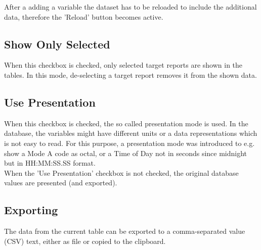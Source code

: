 After a adding a variable the dataset has to be reloaded to include the additional data, therefore the 'Reload' button becomes active.

\subsection{Show Only Selected}

When this checkbox is checked, only selected target reports are shown in the tables. In this mode, de-selecting a target report removes it from the shown data.

\subsection{Use Presentation}

When this checkbox is checked, the so called presentation mode is used. In the database, the variables might have different units or a data representations which is not easy to read. 
For this purpose, a presentation mode was introduced to e.g. show a Mode A code as octal, or a Time of Day not in seconds since midnight but in HH:MM:SS.SS format. \\

When the 'Use Presentation' checkbox is not checked, the original database values are presented (and exported).


\subsection{Exporting}
\label{sec:exporting}

The data from the current  table can be exported to a comma-separated value (CSV) text, either as file or copied to the clipboard. \\

